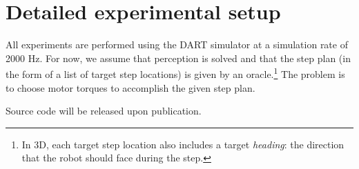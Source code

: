 \documentclass[a4paper]{article}
\begin{document}
\section{Detailed experimental setup}

All experiments are performed using the DART simulator at a simulation rate of 2000 Hz.
For now, we assume that perception is solved and that the step plan (in the form of a list of target step locations) is given by an oracle.\footnote{
In 3D, each target step location also includes a target \emph{heading}: the direction that the robot should face during the step.}
The problem is to choose motor torques to accomplish the given step plan.

Source code will be released upon publication.
\end{document}
